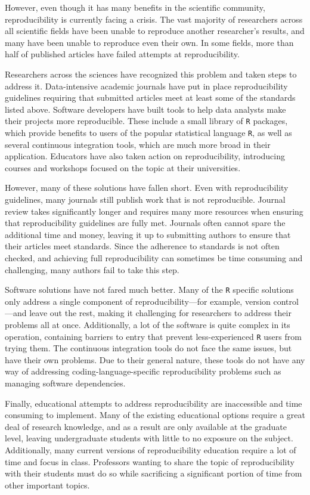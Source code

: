 \documentclass[12pt,twoside]{reedthesis}
\begin{document}
However, even though it has many benefits in the scientific community,
reproducibility is currently facing a crisis. The vast majority of
researchers across all scientific fields have been unable to reproduce
another researcher's results, and many have been unable to reproduce
even their own. In some fields, more than half of published articles
have failed attempts at reproducibility.

Researchers across the sciences have recognized this problem and taken
steps to address it. Data-intensive academic journals have put in place
reproducibility guidelines requiring that submitted articles meet at
least some of the standards listed above. Software developers have built
tools to help data analysts make their projects more reproducible. These
include a small library of \texttt{R} packages, which provide benefits
to users of the popular statistical language \texttt{R}, as well as
several continuous integration tools, which are much more broad in their
application. Educators have also taken action on reproducibility,
introducing courses and workshops focused on the topic at their
universities.

However, many of these solutions have fallen short. Even with
reproducibility guidelines, many journals still publish work that is not
reproducible. Journal review takes significantly longer and requires
many more resources when ensuring that reproducibility guidelines are
fully met. Journals often cannot spare the additional time and money,
leaving it up to submitting authors to ensure that their articles meet
standards. Since the adherence to standards is not often checked, and
achieving full reproducibility can sometimes be time consuming and
challenging, many authors fail to take this step.

Software solutions have not fared much better. Many of the \texttt{R}
specific solutions only address a single component of
reproducibility---for example, version control---and leave out the rest,
making it challenging for researchers to address their problems all at
once. Additionally, a lot of the software is quite complex in its
operation, containing barriers to entry that prevent less-experienced
\texttt{R} users from trying them. The continuous integration tools do
not face the same issues, but have their own problems. Due to their
general nature, these tools do not have any way of addressing
coding-language-specific reproducibility problems such as managing
software dependencies.

Finally, educational attempts to address reproducibility are
inaccessible and time consuming to implement. Many of the existing
educational options require a great deal of research knowledge, and as a
result are only available at the graduate level, leaving undergraduate
students with little to no exposure on the subject. Additionally, many
current versions of reproducibility education require a lot of time and
focus in class. Professors wanting to share the topic of reproducibility
with their students must do so while sacrificing a significant portion
of time from other important topics.
\end{document}
